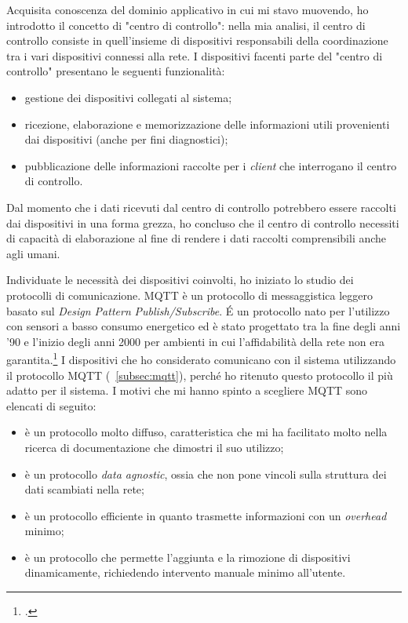 Acquisita conoscenza del dominio applicativo in cui mi stavo muovendo, ho introdotto il concetto di "centro di controllo": nella mia analisi, il centro di controllo consiste in quell'insieme di dispositivi responsabili della coordinazione tra i vari dispositivi connessi alla rete.
I dispositivi facenti parte del "centro di controllo" presentano le seguenti funzionalità:
\begin{itemize}
	\item gestione dei dispositivi collegati al sistema;
	\item ricezione, elaborazione e memorizzazione delle informazioni utili provenienti dai dispositivi (anche per fini diagnostici);
	\item pubblicazione delle informazioni raccolte per i \emph{client} che interrogano il centro di controllo.
\end{itemize}
Dal momento che i dati ricevuti dal centro di controllo potrebbero essere raccolti dai dispositivi in una forma grezza, ho concluso che il centro di controllo necessiti di capacità di elaborazione al fine di rendere i dati raccolti comprensibili anche agli umani.

Individuate le necessità dei dispositivi coinvolti, ho iniziato lo studio dei protocolli di comunicazione. \gls{MQTT} è un protocollo di messaggistica leggero basato sul \emph{Design Pattern} \emph{Publish/Subscribe}.
É un protocollo nato per l'utilizzo con sensori a basso consumo energetico ed è stato progettato tra la fine degli anni '90 e l'inizio degli anni 2000 per ambienti in cui l'affidabilità della rete non era garantita.\footcite{mqtt}
I dispositivi che ho considerato comunicano con il sistema utilizzando il protocollo MQTT (~\ref{subsec:mqtt}), perché ho ritenuto questo protocollo il più adatto per il sistema.
I motivi che mi hanno spinto a scegliere MQTT sono elencati di seguito:
\begin{itemize}
	\item è un protocollo molto diffuso, caratteristica che mi ha facilitato molto nella ricerca di documentazione che dimostri il suo utilizzo;
	\item è un protocollo \emph{data agnostic}, ossia che non pone vincoli sulla struttura dei dati scambiati nella rete;
	\item è un protocollo efficiente in quanto trasmette informazioni con un \emph{overhead} minimo;
	\item è un protocollo che permette l'aggiunta e la rimozione di dispositivi dinamicamente, richiedendo intervento manuale minimo all'utente.
\end{itemize}

